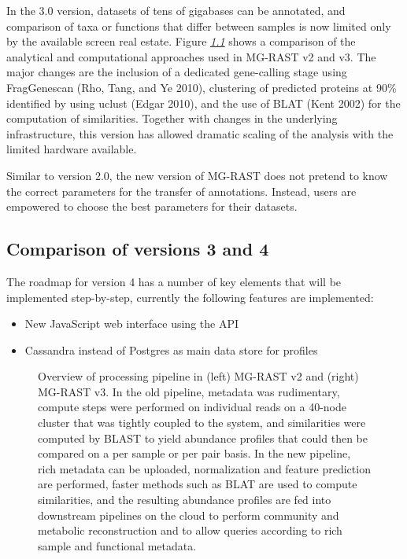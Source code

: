\documentclass[letterpaper,10pt,english]{sphinxmanual}
\begin{document}
In the 3.0 version, datasets of tens of gigabases can be annotated, and
comparison of taxa or functions that differ between samples is now
limited only by the available screen real estate. Figure
{\hyperref[\detokenize{user_manual:fig:mgrastv2VSv3}]{\emph{1.1}}} shows a comparison of the analytical and
computational approaches used in MG-RAST v2 and v3. The major changes
are the inclusion of a dedicated gene-calling stage using FragGenescan
(Rho, Tang, and Ye 2010), clustering of predicted proteins at 90\%
identified by using uclust (Edgar 2010), and the use of BLAT (Kent 2002)
for the computation of similarities. Together with changes in the
underlying infrastructure, this version has allowed dramatic scaling of
the analysis with the limited hardware available.

Similar to version 2.0, the new version of MG-RAST does not pretend to
know the correct parameters for the transfer of annotations. Instead,
users are empowered to choose the best parameters for their datasets.


\subsection{Comparison of versions 3 and 4}
\label{\detokenize{user_manual:comparison-of-versions-3-and-4}}
The roadmap for version 4 has a number of key elements that will be
implemented step-by-step, currently the following features are
implemented:
\begin{itemize}
\item {} 
New JavaScript web interface using the API

\item {} 
Cassandra instead of Postgres as main data store for profiles

\end{itemize}

\begin{figure}[htbp]
\centering
\capstart

\noindent{}
\caption{Overview of processing pipeline in (left) MG-RAST v2 and (right)
MG-RAST v3. In the old pipeline, metadata was rudimentary, compute
steps were performed on individual reads on a 40-node cluster that
was tightly coupled to the system, and similarities were computed by
BLAST to yield abundance profiles that could then be compared on a
per sample or per pair basis. In the new pipeline, rich metadata can
be uploaded, normalization and feature prediction are performed,
faster methods such as BLAT are used to compute similarities, and the
resulting abundance profiles are fed into downstream pipelines on the
cloud to perform community and metabolic reconstruction and to allow
queries according to rich sample and functional metadata.}\label{\detokenize{user_manual:fig-mgrastv2vsv3}}\end{figure}
\end{document}
